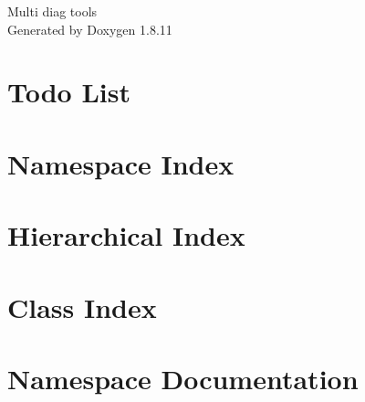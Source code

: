 \documentclass[twoside]{book}
\newcommand{\+}{\discretionary{\mbox{\scriptsize$\hookleftarrow$}}{}{}}
\newcommand{\clearemptydoublepage}{%
  \newpage{\pagestyle{empty}\cleardoublepage}%
}
\begin{document}
\hypersetup{pageanchor=false,
             bookmarksnumbered=true,
             pdfencoding=unicode
            }
\begin{titlepage}
\vspace*{7cm}
\begin{center}%
{\Large Multi diag tools }\\
\vspace*{1cm}
{\large Generated by Doxygen 1.8.11}\\
\end{center}
\end{titlepage}
\clearemptydoublepage
\tableofcontents
\clearemptydoublepage
{}
\hypersetup{pageanchor=true}

\chapter{Todo List}
\label{todo}
\hypertarget{todo}{}

\chapter{Namespace Index}

\chapter{Hierarchical Index}

\chapter{Class Index}

\chapter{Namespace Documentation}


\end{document}
